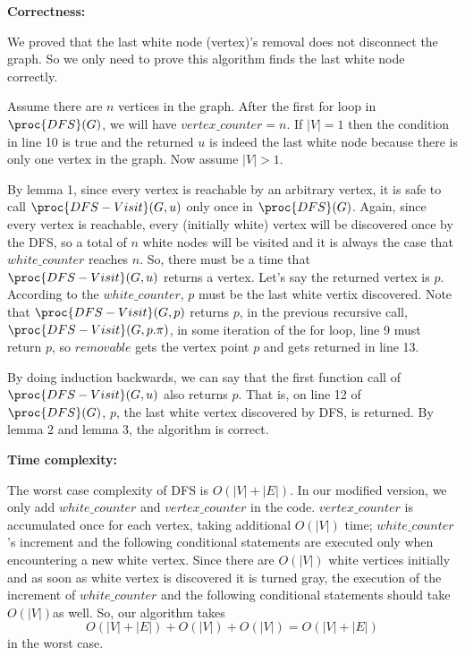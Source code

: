 \documentclass[11pt, answers]{exam}
\theoremstyle{plain}
\theoremstyle{definition}
\begin{document}
\begin{questions}
\begin{solution}
\textbf{Correctness:}

We proved that the last white node (vertex)'s removal does not disconnect the graph. So we only need to prove this algorithm finds the last white node correctly.

Assume there are $n$ vertices in the graph. After the first for loop in $\proc{DFS}(G)$, we will have $vertex\_counter = n$. If $|V| = 1$ then the condition in line 10 is true and the returned $u$ is indeed the last white node because there is only one vertex in the graph. Now assume $|V|>1$.

By lemma 1, since every vertex is reachable by an arbitrary vertex, it is safe to call $\proc{DFS-Visit}(G,u)$ only once in $\proc{DFS}(G)$. Again, since every vertex is reachable, every (initially white) vertex will be discovered once by the DFS, so a total of $n$ white nodes will be visited and it is always the case that $white\_counter$ reaches $n$. So, there must be a time that $\proc{DFS-Visit}(G,u)$ returns a vertex. Let's say the returned vertex is $p$. According to the $white\_counter$, $p$ must be the last white vertix discovered. Note that $\proc{DFS-Visit}(G,p)$ returns $p$, in the previous recursive call, $\proc{DFS-Visit}(G,p.\pi)$, in some iteration of the for loop, line 9 must return $p$, so $removable$ gets the vertex point $p$ and gets returned in line 13.

By doing induction backwards, we can say that the first function call of $\proc{DFS-Visit}(G,u)$ also returns $p$. That is, on line 12 of $\proc{DFS}(G)$, $p$, the last white vertex discovered by DFS, is returned. By lemma 2 and lemma 3, the algorithm is correct.

\textbf{Time complexity:}

The worst case complexity of DFS is $O(|V|+|E|)$. In our modified version, we only add $white\_counter$ and $vertex\_counter$ in the code. $vertex\_counter$ is accumulated once for each vertex, taking additional $O(|V|)$ time; $white\_counter$'s increment and the following conditional statements are executed only when encountering a new white vertex. Since there are $O(|V|)$ white vertices initially and as soon as white vertex is discovered it is turned gray, the execution of the increment of $white\_counter$ and the following conditional statements should take $O(|V|)$as well. So, our algorithm takes $$O(|V|+|E|)+O(|V|)+O(|V|)=O(|V|+|E|)$$ in the worst case.

\end{solution}


\end{questions}
\end{document}
